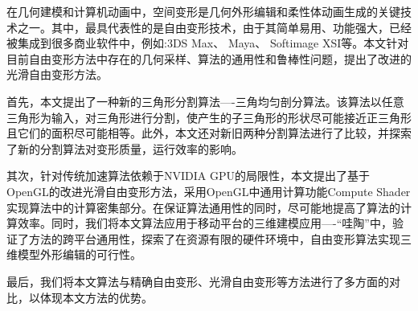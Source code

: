 
\begin{cabstract}

    在几何建模和计算机动画中，空间变形是几何外形编辑和柔性体动画生成的关键技术之一。其中，最具代表性的是自由变形技术，由于其简单易用、功能强大，已经被集成到很多商业软件中，例如:3DS Max、 Maya、 Softimage XSI等。本文针对目前自由变形方法中存在的几何采样、算法的通用性和鲁棒性问题，提出了改进的光滑自由变形方法。

    首先，本文提出了一种新的三角形分割算法----三角均匀剖分算法。该算法以任意三角形为输入，对三角形进行分割，使产生的子三角形的形状尽可能接近正三角形且它们的面积尽可能相等。此外，本文还对新旧两种分割算法进行了比较，并探索了新的分割算法对变形质量，运行效率的影响。

    其次，针对传统加速算法依赖于NVIDIA GPU的局限性，本文提出了基于OpenGL的改进光滑自由变形方法，采用OpenGL中通用计算功能Compute Shader实现算法中的计算密集部分。在保证算法通用性的同时，尽可能地提高了算法的计算效率。同时，我们将本文算法应用于移动平台的三维建模应用----“哇陶”中，验证了方法的跨平台通用性，探索了在资源有限的硬件环境中，自由变形算法实现三维模型外形编辑的可行性。

    最后，我们将本文算法与精确自由变形、光滑自由变形等方法进行了多方面的对比，以体现本文方法的优势。

\end{cabstract}


